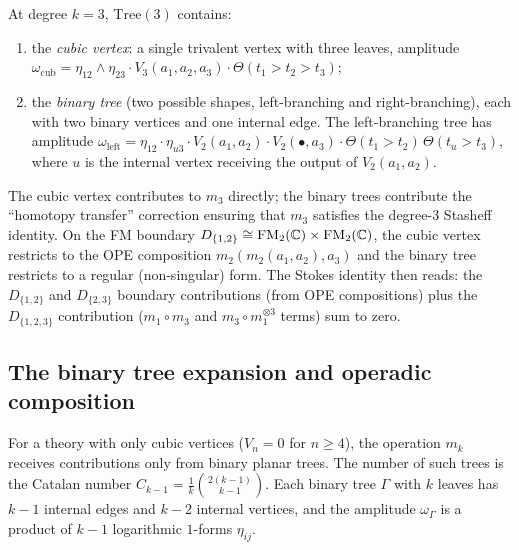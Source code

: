 \begin{example}
At degree $k = 3$, $\mathrm{Tree}(3)$ contains:
\begin{enumerate}[label=(\alph*)]
\item the \emph{cubic vertex}: a single trivalent vertex with
 three leaves, amplitude
 $\omega_{\mathrm{cub}} = \eta_{12} \wedge \eta_{23}
 \cdot V_3(a_1, a_2, a_3) \cdot \Theta(t_1 > t_2 > t_3)$;
\item the \emph{binary tree} (two possible shapes,
 left-branching and right-branching), each with two binary
 vertices and one internal edge. The left-branching tree has
 amplitude
 $\omega_{\mathrm{left}} = \eta_{12} \cdot \eta_{u3}
 \cdot V_2(a_1, a_2) \cdot V_2(\bullet, a_3)
 \cdot \Theta(t_1 > t_2)\,\Theta(t_u > t_3)$,
 where $u$ is the internal vertex receiving the output of $V_2(a_1, a_2)$.
\end{enumerate}
The cubic vertex contributes to $m_3$ directly; the binary trees
contribute the ``homotopy transfer'' correction ensuring that
$m_3$ satisfies the degree-$3$ Stasheff identity. On the FM boundary
$D_{\{1,2\}} \cong \operatorname{FM}_2(\mathbb{C}) \times \operatorname{FM}_2(\mathbb{C})$, the cubic
vertex restricts to the OPE composition $m_2(m_2(a_1, a_2), a_3)$
and the binary tree restricts to a regular (non-singular) form.
The Stokes identity then reads: the $D_{\{1,2\}}$ and $D_{\{2,3\}}$
boundary contributions (from OPE compositions) plus the
$D_{\{1,2,3\}}$ contribution ($m_1 \circ m_3$ and
$m_3 \circ m_1^{\otimes 3}$ terms) sum to zero.
\end{example}

\subsection{The binary tree expansion and operadic composition}

\begin{proposition}
For a theory with only cubic vertices ($V_n = 0$ for $n \ge 4$),
the operation $m_k$ receives contributions only from binary planar
trees. The number of such trees is the Catalan number
$C_{k-1} = \frac{1}{k}\binom{2(k-1)}{k-1}$. Each binary tree
$\Gamma$ with $k$ leaves has $k - 1$ internal edges and $k - 2$
internal vertices, and the amplitude $\omega_\Gamma$ is a product
of $k - 1$ logarithmic $1$-forms $\eta_{ij}$.
\end{proposition}

